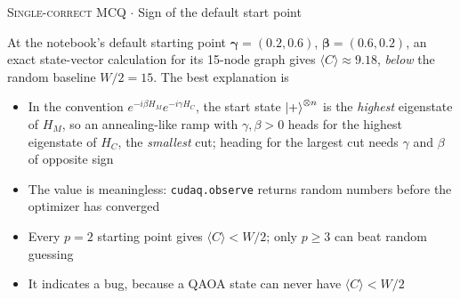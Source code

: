 \documentclass[11pt,a4paper]{article}
\newcommand{\optlabel}[1]{\textbf{(#1)}}
\newcommand{\correctlabel}[1]{\textcolor{okgreen}{\textbf{(#1)}\,\ding{51}}}
\newenvironment{qitem}[1]{\begin{list}{}{\setlength{\leftmargin}{3.3em}\setlength{\labelwidth}{3.1em}%
  \setlength{\labelsep}{0.2em}\setlength{\topsep}{3pt}\setlength{\parsep}{3pt}}\item[\textbf{Q.#1}\hfill]}{\end{list}}
\newcommand{\qmeta}[2]{{\footnotesize\color{black!60}\textsc{#1} \;$\cdot$\; #2}\par}
\begin{document}
\begin{qitem}{54}
\qmeta{Single-correct MCQ}{Sign of the default start point}
At the notebook's default starting point $\boldsymbol\gamma = (0.2, 0.6)$, $\boldsymbol\beta = (0.6, 0.2)$, an exact
state-vector calculation for its 15-node graph gives $\langle C\rangle \approx 9.18$, \emph{below} the random baseline $W/2 = 15$.
The best explanation is
\begin{itemize}[leftmargin=2.6em, labelsep=0.4em, itemsep=2pt, topsep=3pt]
\item[\correctlabel{A}] In the convention $e^{-i\beta H_M}e^{-i\gamma H_C}$, the start state $\ket+^{\otimes n}$ is the \emph{highest} eigenstate of $H_M$, so an annealing-like ramp with $\gamma, \beta > 0$ heads for the highest eigenstate of $H_C$, the \emph{smallest} cut; heading for the largest cut needs $\gamma$ and $\beta$ of opposite sign
\item[\optlabel{B}] The value is meaningless: \texttt{cudaq.observe} returns random numbers before the optimizer has converged
\item[\optlabel{C}] Every $p = 2$ starting point gives $\langle C\rangle < W/2$; only $p \ge 3$ can beat random guessing
\item[\optlabel{D}] It indicates a bug, because a QAOA state can never have $\langle C\rangle < W/2$
\end{itemize}
\end{qitem}
\end{document}
